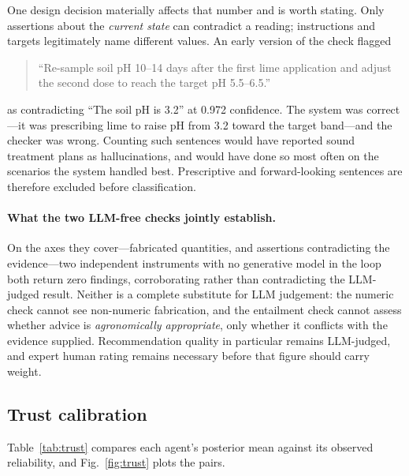 \documentclass[preprint,12pt]{elsarticle}
\begin{document}
One design decision materially affects that number and is worth stating.
Only assertions about the \emph{current state} can contradict a reading;
instructions and targets legitimately name different values. An early
version of the check flagged

\begin{quote}\small
``Re-sample soil pH 10--14 days after the first lime application and adjust
the second dose to reach the target pH 5.5--6.5.''
\end{quote}

\noindent as contradicting ``The soil pH is 3.2'' at 0.972 confidence. The
system was correct---it was prescribing lime to raise pH from 3.2 toward
the target band---and the checker was wrong. Counting such sentences would
have reported sound treatment plans as hallucinations, and would have done
so most often on the scenarios the system handled best. Prescriptive and
forward-looking sentences are therefore excluded before classification.

\paragraph{What the two LLM-free checks jointly establish.} On the axes
they cover---fabricated quantities, and assertions contradicting the
evidence---two independent instruments with no generative model in the
loop both return zero findings, corroborating rather than contradicting
the LLM-judged result. Neither is a complete substitute for LLM judgement:
the numeric check cannot see non-numeric fabrication, and the entailment
check cannot assess whether advice is \emph{agronomically appropriate},
only whether it conflicts with the evidence supplied. Recommendation
quality in particular remains LLM-judged, and expert human rating remains
necessary before that figure should carry weight.

\subsection{Trust calibration}

Table~\ref{tab:trust} compares each agent's posterior mean against its
observed reliability, and Fig.~\ref{fig:trust} plots the pairs.
\end{document}
